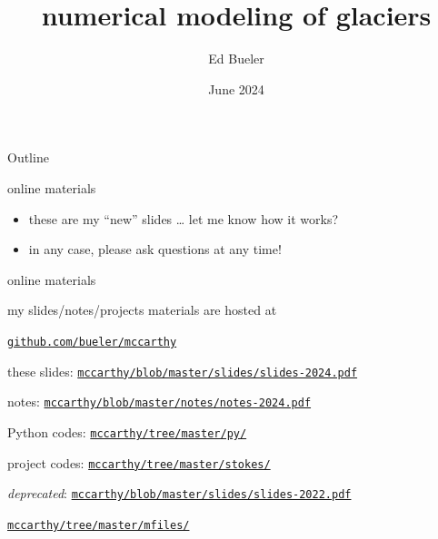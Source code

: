 \documentclass[10pt]{beamer}
\title{numerical modeling of glaciers}
\date{June 2024}
\author{Ed Bueler}
\institute{the Hardware Store at McCarthy}
\begin{document}
\graphicspath{{../figures/}}

\maketitle

\begin{frame}{Outline}
  \tableofcontents
\end{frame}

\begin{frame}{online materials}

\begin{itemize}
\item these are my ``new'' slides \dots\xspace let me know how it works?
\item in any case, \alert{please ask questions at any time!}
\end{itemize}

\bigskip

\begin{block}{online materials}

my slides/notes/projects materials are hosted at

\medskip
\centerline{\href{https://github.com/bueler/mccarthy}{\texttt{github.com/bueler/mccarthy}}}
\end{block}

\medskip
{\footnotesize
\alert{these slides:} {\footnotesize \href{https://github.com/bueler/mccarthy/blob/master/slides/slides-2024.pdf}{\texttt{mccarthy/blob/master/slides/slides-2024.pdf}}}

notes: {\footnotesize \href{https://github.com/bueler/mccarthy/blob/master/notes/notes-2024.pdf}{\texttt{mccarthy/blob/master/notes/notes-2024.pdf}}}

\alert{Python codes:} {\footnotesize \href{https://github.com/bueler/mccarthy/tree/master/py}{\texttt{mccarthy/tree/master/py/}}}

project codes: {\footnotesize \href{https://github.com/bueler/mccarthy/tree/master/stokes}{\texttt{mccarthy/tree/master/stokes/}}}

\bigskip
\emph{deprecated}: {\footnotesize \href{https://github.com/bueler/mccarthy/blob/master/slides/slides-2022.pdf}{\texttt{mccarthy/blob/master/slides/slides-2022.pdf}}}

\vspace{-2mm}
\hspace{14.7mm} {\footnotesize \href{https://github.com/bueler/mccarthy/tree/master/mfiles}{\texttt{mccarthy/tree/master/mfiles/}}}
}
\end{frame}
\end{document}
